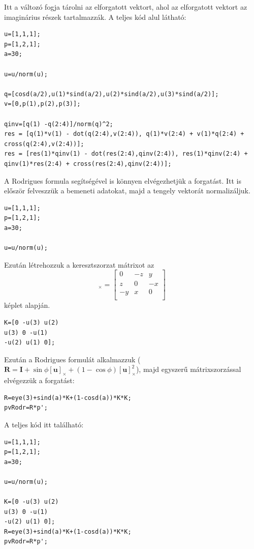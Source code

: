 \begin{answer}
Itt a  változó fogja tárolni az elforgatott vektort, ahol az elforgatott vektort az imaginárius részek tartalmazzák. A teljes kód alul látható:
\begin{lstlisting}
u=[1,1,1];
p=[1,2,1];
a=30;

u=u/norm(u);

q=[cosd(a/2),u(1)*sind(a/2),u(2)*sind(a/2),u(3)*sind(a/2)];
v=[0,p(1),p(2),p(3)];

qinv=[q(1) -q(2:4)]/norm(q)^2;
res = [q(1)*v(1) - dot(q(2:4),v(2:4)), q(1)*v(2:4) + v(1)*q(2:4) + cross(q(2:4),v(2:4))];
res = [res(1)*qinv(1) - dot(res(2:4),qinv(2:4)), res(1)*qinv(2:4) + qinv(1)*res(2:4) + cross(res(2:4),qinv(2:4))];
\end{lstlisting}

A Rodrigues formula segítségével is könnyen elvégezhetjük a forgatást. Itt is először felveszzük a bemeneti adatokat, majd a tengely vektorát normalizáljuk.
\begin{lstlisting}
u=[1,1,1];
p=[1,2,1];
a=30;

u=u/norm(u);
\end{lstlisting}

Ezután létrehozzuk a keresztszorzat mátrixot az
\begin{equation*}
[\mathbf{u}]_\times=\begin{bmatrix}
0 & -z & y \\
z & 0 & -x \\
-y & x & 0 \\
\end{bmatrix}
\end{equation*}
képlet alapján.
\begin{lstlisting}
K=[0 -u(3) u(2)
u(3) 0 -u(1)
-u(2) u(1) 0];
\end{lstlisting}

Ezután a Rodrigues formulát alkalmazzuk ($\mathbf{R}=\mathbf{I}+\sin\phi[\mathbf{u}]_\times+(1-\cos\phi)[\mathbf{u}]^2_\times$), majd egyszerű mátrixszorzással elvégezzük a forgatást:
\begin{lstlisting}
R=eye(3)+sind(a)*K+(1-cosd(a))*K*K;
pvRodr=R*p';
\end{lstlisting}

A teljes kód itt található:
\begin{lstlisting}
u=[1,1,1];
p=[1,2,1];
a=30;

u=u/norm(u);

K=[0 -u(3) u(2)
u(3) 0 -u(1)
-u(2) u(1) 0];
R=eye(3)+sind(a)*K+(1-cosd(a))*K*K;
pvRodr=R*p';
\end{lstlisting}

\end{answer}

